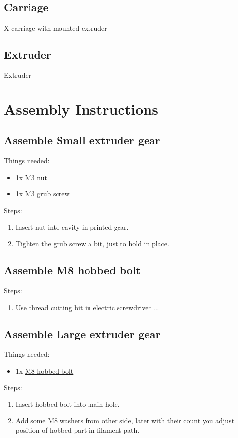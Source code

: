 \documentclass[11pt]{article}
\begin{document}
\hypertarget{thing_carriage}{\subsection{Carriage}}
X-carriage with mounted extruder

\hypertarget{thing_extruder}{\subsection{Extruder}}
Extruder

\newpage

\section{Assembly Instructions}

\subsection{Assemble Small extruder gear}
Things needed:
\begin{itemize}
\item 1x M3 nut
\item 1x M3 grub screw
\end{itemize}
Steps:
\begin{enumerate}
\item Insert nut into cavity in printed gear.
\item Tighten the grub screw a bit, just to hold in place.
\end{enumerate}

\subsection{Assemble M8 hobbed bolt}Steps:
\begin{enumerate}
\item Use thread cutting bit in electric screwdriver ...
\end{enumerate}

\subsection{Assemble Large extruder gear}
Things needed:
\begin{itemize}
\item 1x \hyperlink{thing_hobbed-bolt}{M8 hobbed bolt}
\end{itemize}
Steps:
\begin{enumerate}
\item Insert hobbed bolt into main hole.
\item Add some M8 washers from other side, later with their count you adjust position of hobbed part in filament path.
\end{enumerate}
\end{document}
